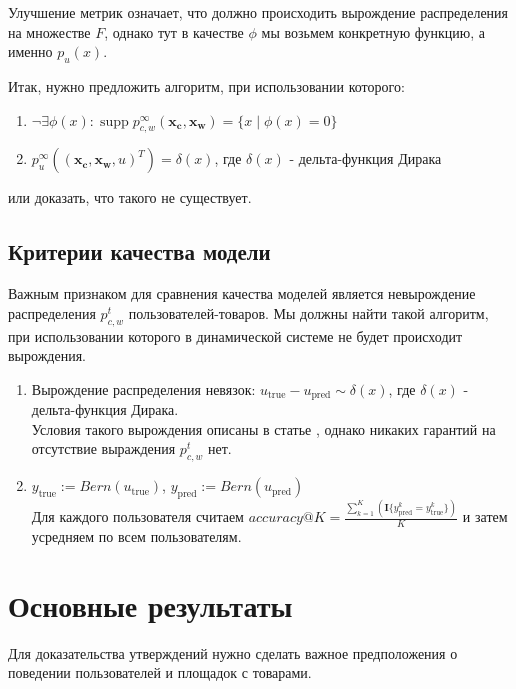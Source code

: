 \documentclass{article}
\DeclareMathOperator\supp{supp}
\begin{document}
Улучшение метрик означает, что должно происходить вырождение распределения на множестве $F$, однако тут в качестве $\phi$ мы возьмем конкретную функцию, а именно $p_u(x)$.

Итак, нужно предложить алгоритм, при использовании которого:
\begin{enumerate}
    \item $\neg \exists \phi(x) : \supp p_{c, w}^{\infty}(\mathbf{x_c}, \mathbf{x_w}) = \{x \; |\; \phi(x) = 0\}$
    \item $p_u^{\infty}((\mathbf{x_c}, \mathbf{x_w}, u)^T) = \delta(x)$, где $\delta(x)$ - дельта-функция Дирака
\end{enumerate}
или доказать, что такого не существует.

\subsection{Критерии качества модели}
Важным признаком для сравнения качества моделей является невырождение распределения $p^t_{c,w}$ пользователей-товаров. Мы должны найти такой алгоритм, при использовании
которого в динамической системе не будет происходит вырождения.
\begin{enumerate}
    \item Вырождение распределения невязок: $u_{\text{true}} - u_{\text{pred}} \sim \delta(x)$, где $\delta(x)$ - дельта-функция Дирака.\\
    Условия такого вырождения описаны в статье \cite{veprikov2024mathematical}, однако никаких гарантий на отсутствие выраждения $p^t_{c,w}$ нет.
    
    \item $y_{\text{true}} := Bern(u_{\text{true}})$, 
    $y_{\text{pred}} := Bern(u_{\text{pred}})$\\
    Для каждого пользователя считаем $accuracy@K = \frac{\sum^K_{k = 1} (\mathbf{I}\{y^k_{\text{pred}} = y^k_{\text{true}}\})} {K}$ и затем усредняем по всем пользователям.

\end{enumerate}

\section{Основные результаты}
Для доказательства утверждений нужно сделать важное предположения о поведении пользователей и площадок с товарами.\\
\end{document}
